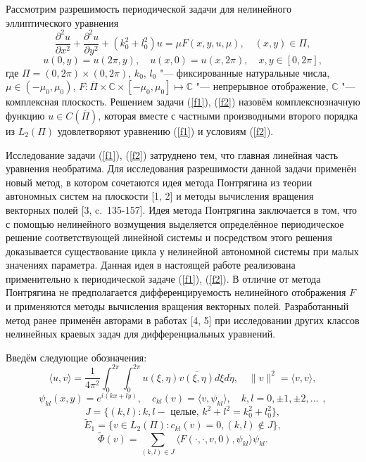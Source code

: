 
\vzmscaption

Рассмотрим разрешимость периодической задачи для нелинейного
эллиптического уравнения
\begin{equation}\label{f1}
\frac{\partial^2u}{\partial x^2}+\frac{\partial^2u}{\partial
y^2}+(k_0^2+l_0^2)u=\mu F(x,y,u,\mu), \quad (x, y)\in \Pi,
\end{equation}
\begin{equation}\label{f2}
u(0,y)=u(2\pi ,y), \quad u(x,0)=u(x,2\pi), \quad x, y\in [0,
2\pi],
\end{equation}
где $\Pi=(0,2\pi)\times (0,2\pi)$, $k_0$, $l_0$ "--- фиксированные натуральные числа, $\mu\in
(-\mu_0, \mu_0)$, $F : \overline{\Pi}\times \mathbb{C}\times
[-\mu_0, \mu_0]\mapsto \mathbb{C}$ "--- непрерывное отображение,
$\mathbb{C}$ "--- комплексная плоскость. Решением задачи (\ref{f1}),
(\ref{f2}) назовём комплекснозначную функцию $u\in
C(\overline{\Pi})$, которая вместе с частными производными второго
порядка из $L_2(\Pi)$ удовлетворяют уравнению (\ref{f1}) и
условиям (\ref{f2}).

Исследование задачи (\ref{f1}), (\ref{f2}) затруднено тем, что
главная линейная часть уравнения необратима. Для исследования
разрешимости данной задачи применён новый метод, в котором
сочетаются идея метода Понтрягина из теории автономных систем на
плоскости [1, 2] и методы вычисления вращения векторных полей [3, c.~135-157].
Идея метода Понтрягина заключается
в том, что с помощью нелинейного возмущения выделяется
определённое периодическое решение соответствующей линейной
системы и посредством этого решения доказывается существование
цикла у нелинейной автономной системы при малых значениях
параметра. Данная идея в настоящей работе реализована
применительно к периодической задаче (\ref{f1}), (\ref{f2}). В
отличие от метода Понтрягина не предполагается дифференцируемость
нелинейного отображения $F$ и применяются методы вычисления
вращения векторных полей.
Разработанный метод ранее применён авторами в работах [4, 5]
при исследовании других классов нелинейных краевых
задач для дифференциальных уравнений.

Введём следующие обозначения:
$$
\langle u , v \rangle =
\frac{1}{4\pi^2}\int_0^{2\pi}\int_0^{2\pi}u(\xi,\eta)\overline{v(\xi,\eta)}d\xi
d\eta, \quad \|v\|^2=\langle v , v \rangle,
$$
$$
\psi_{kl}(x,y)=e^{i(kx+ly)}, \quad c_{kl}(v)=\langle v , \psi_{kl}\rangle,
\quad k, l = 0, \pm 1, \pm 2, \ldots \ \  ,
$$
$$
J=\{(k,l): k, l - \mbox{ целые, } k^2+l^2=k_0^2+l_0^2 \},
$$
$$
\widetilde{E}_1=\{ v\in L_2(\Pi):  c_{kl}(v)=0, (k,l)\not\in J \},
$$
$$
\widetilde{\Phi}(v)=\sum_{(k,l)\in
J}\langle F(\cdot,\cdot,v,0),\psi_{kl}\rangle\psi_{kl}.
$$

